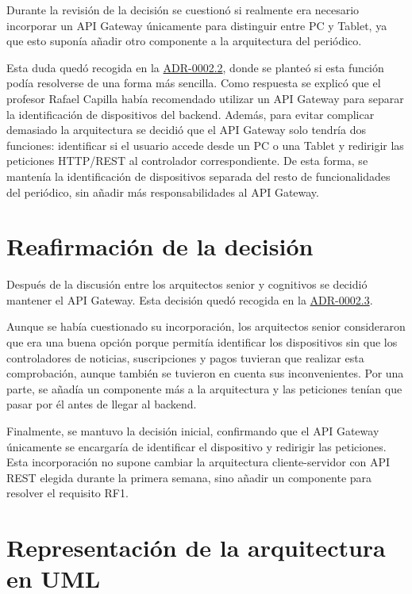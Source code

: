 Durante la revisión de la decisión se cuestionó si realmente era necesario incorporar un API Gateway únicamente para distinguir entre PC y Tablet, ya que esto suponía añadir otro componente a la arquitectura del periódico.

Esta duda quedó recogida en la \href{Decisiones/0002.2-cuestionamiento-incorporacion-api-gateway.md}{ADR-0002.2}, donde se planteó si esta función podía resolverse de una forma más sencilla. Como respuesta se explicó que el profesor Rafael Capilla había recomendado utilizar un API Gateway para separar la identificación de dispositivos del backend. Además, para evitar complicar demasiado la arquitectura se decidió que el API Gateway solo tendría dos funciones: identificar si el usuario accede desde un PC o una Tablet y redirigir las peticiones HTTP/REST al controlador correspondiente. De esta forma, se mantenía la identificación de dispositivos separada del resto de funcionalidades del periódico, sin añadir más responsabilidades al API Gateway.

\section{Reafirmación de la decisión}

Después de la discusión entre los arquitectos senior y cognitivos se decidió mantener el API Gateway. Esta decisión quedó recogida en la \href{Decisiones/0002.3-reafirmacion-incorporacion-api-gateway.md}{ADR-0002.3}.

Aunque se había cuestionado su incorporación, los arquitectos senior consideraron que era una buena opción porque permitía identificar los dispositivos sin que los controladores de noticias, suscripciones y pagos tuvieran que realizar esta comprobación, aunque también se tuvieron en cuenta sus inconvenientes. Por una parte, se añadía un componente más a la arquitectura y las peticiones tenían que pasar por él antes de llegar al backend.

Finalmente, se mantuvo la decisión inicial, confirmando que el API Gateway únicamente se encargaría de identificar el dispositivo y redirigir las peticiones. Esta incorporación no supone cambiar la arquitectura cliente-servidor con API REST elegida durante la primera semana, sino añadir un componente para resolver el requisito RF1.

\section{Representación de la arquitectura en UML}

